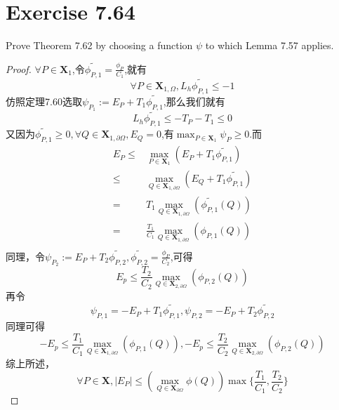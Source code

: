 \documentclass[twoside,a4paper]{ctexart}
\begin{document}
  \section*{Exercise 7.64}
  Prove Theorem 7.62 by choosing a function $\psi$ to which Lemma 7.57 applies.
  \begin{proof}
    $\forall P\in \textbf{X}_1$,令$\widetilde{\phi_{P,1}}=\frac{\phi_P}{C_1}$,就有
    \begin{equation*}
      \forall P\in\textbf{X}_{1,\Omega},L_h\widetilde{\phi_{P,1}}\leq -1
    \end{equation*}
    仿照定理7.60选取$\psi_{P_1} := E_P + T_1\widetilde{\phi_{P,1}}$,那么我们就有
    \begin{equation*}
      L_h\widetilde{\phi_{P,1}} \leq -T_P-T_1 \leq 0
    \end{equation*}
    又因为$\widetilde{\phi_{P,1}} \geq 0, \forall Q\in \textbf{X}_{1,\partial\Omega}, E_Q=0$,有$\max_{P\in\textbf{X}_1}\psi_P\geq 0  $.而
    \begin{align*}
      E_P \leq {} & \max_{P\in\textbf{X}_1}(E_P+T_1\widetilde{\phi_{P,1}}) \\
      \leq {} & \max_{Q\in\textbf{X}_{1,\partial\Omega}}(E_Q+T_1\widetilde{\phi_{P,1}}) \\
      ={} & T_1\max_{Q\in\textbf{X}_{1,\partial\Omega}}(\widetilde{\phi_{P,1}}(Q)) \\
      ={} & \frac{T_1}{C_1}\max_{Q\in\textbf{X}_{1,\partial\Omega}}(\phi_{P,1}(Q)) \\
    \end{align*}
    同理，令$\psi_{P_2} := E_P + T_2\widetilde{\phi_{P,2}}, \widetilde{\phi_{P,2}}=\frac{\phi_P}{C_2}$,可得
    \begin{equation*}
      E_p \leq \frac{T_2}{C_2}\max_{Q\in\textbf{X}_{2,\partial\Omega}}(\phi_{P,2}(Q))
    \end{equation*}
    再令
    \begin{equation*}
      \psi_{P,1} = -E_P + T_1\widetilde{\phi_{P,1}}, \psi_{P,2} = -E_P + T_2\widetilde{\phi_{P,2}}
    \end{equation*}
    同理可得
    \begin{equation*}
      -E_p \leq \frac{T_1}{C_1}\max_{Q\in\textbf{X}_{1,\partial\Omega}}(\phi_{P,1}(Q)), -E_p \leq \frac{T_2}{C_2}\max_{Q\in\textbf{X}_{2,\partial\Omega}}(\phi_{P,2}(Q))
    \end{equation*}
    综上所述，
    \begin{equation*}
      \forall P\in\textbf{X}, \lvert E_P\rvert \leq \left( \max_{Q\in\textbf{X}_{\partial\Omega}}\phi(Q) \right)\max\bigg\{ \frac{T_1}{C_1}, \frac{T_2}{C_2} \bigg\}
      \end{equation*}
  \end{proof}
  
    

  
\end{document}
